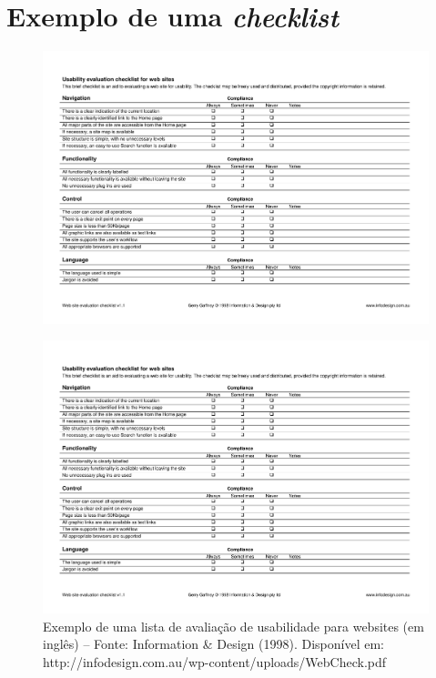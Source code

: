 \documentclass[portuguese,oneside]{tcc}
\begin{document}
\chapter{\label{apnd:checklist}Exemplo de uma \emph{checklist}}
\begin{figure}[H]
    \centering\includegraphics[page=1,width=1\textwidth]{pdf/apnd-webchecklist.pdf}
\end{figure}
\begin{figure}[H]
    \centering\includegraphics[page=2,width=1\textwidth]{pdf/apnd-webchecklist.pdf}
 \caption[Exemplo de uma \emph{Checklist}]{\label{apnd:checklist}Exemplo de uma lista de avaliação de usabilidade para websites (em inglês) -- Fonte: Information \& Design (1998). Disponível em: http://infodesign.com.au/wp-content/uploads/WebCheck.pdf}
\end{figure}
\end{document}
